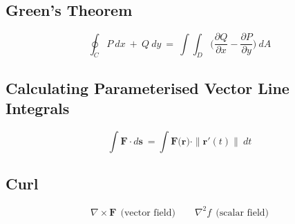 \documentclass{article}
\begin{document}
  \subsection{Green's Theorem}
    $$
      \oint_C P \ dx \ + \ Q \ dy \ =
      \ \int \int_D \bigg( \frac{\partial Q}{\partial x} - \frac{\partial P}{\partial y} \bigg) \ dA
    $$

  \subsection{Calculating Parameterised Vector Line Integrals}
    $$
      \int \mathbf{F} \cdot d\mathbf{s} \ =  \int \mathbf{F} \big( \mathbf{r} \big) \cdot \|   \mathbf{ r'  } (t)  \| \ dt
    $$

  \subsection{Curl}
    $$
      \nabla \times \mathbf{F} \ \  \text{(vector field)} \qquad \nabla^{2} f \ \ \text{(scalar field)}
    $$

  \subsection{}
\end{document}
